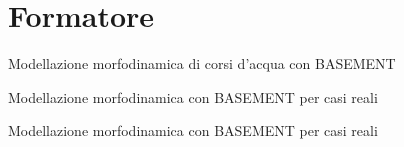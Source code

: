 
\section{Formatore}

 Modellazione morfodinamica di corsi d'acqua con BASEMENT
\sectionsep

 Modellazione morfodinamica con BASEMENT per casi reali
\sectionsep

 Modellazione morfodinamica con BASEMENT per casi reali
\sectionsep

